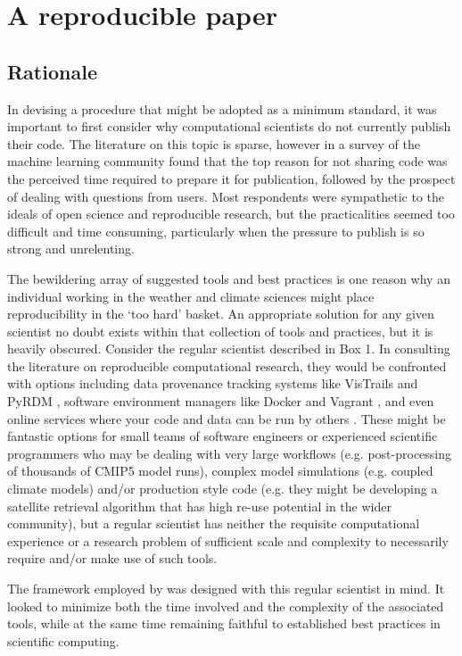 \section{A reproducible paper}

\subsection{Rationale}

In devising a procedure that might be adopted as a minimum standard, it was important to first consider why computational scientists do not currently publish their code. The literature on this topic is sparse, however in a survey of the machine learning community \citet{Stodden2010} found that the top reason for not sharing code was the perceived time required to prepare it for publication, followed by the prospect of dealing with questions from users. Most respondents were sympathetic to the ideals of open science and reproducible research, but the practicalities seemed too difficult and time consuming, particularly when the pressure to publish is so strong and unrelenting.

The bewildering array of suggested tools and best practices is one reason why an individual working in the weather and climate sciences might place reproducibility in the `too hard' basket. An appropriate solution for any given scientist no doubt exists within that collection of tools and practices, but it is heavily obscured. Consider the regular scientist described in Box 1. In consulting the literature on reproducible computational research, they would be confronted with options including data provenance tracking systems like VisTrails \citep{Freire2012} and PyRDM \citep{Jacobs2014}, software environment managers like Docker and Vagrant \citep{Stodden2014}, and even online services where your code and data can be run by others \citep{Stodden2012}. These might be fantastic options for small teams of software engineers or experienced scientific programmers who may be dealing with very large workflows (e.g. post-processing of thousands of CMIP5 model runs), complex model simulations (e.g. coupled climate models) and/or production style code (e.g. they might be developing a satellite retrieval algorithm that has high re-use potential in the wider community), but a regular scientist has neither the requisite computational experience or a research problem of sufficient scale and complexity to necessarily require and/or make use of such tools.

The framework employed by \citet{Irving2016} was designed with this regular scientist in mind. It looked to minimize both the time involved and the complexity of the associated tools, while at the same time remaining faithful to established best practices in scientific computing.
  

